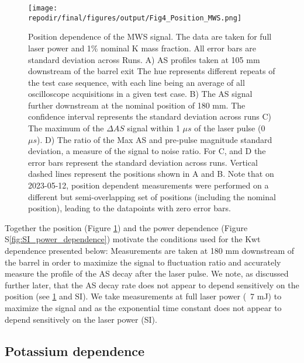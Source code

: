 \begin{figure}[h]
    \texttt{[image: \\repodir/final/figures/output/Fig4\_Position\_MWS.png]} 
    \centering
    \caption{Position dependence of the MWS signal. The data are taken for full laser power and 1\% nominal K mass fraction. All error bars are standard deviation across Runs.  A) AS profiles taken at 105 mm downstream of the barrel exit The hue represents different repeats of the test case sequence, with each line being an average of all oscilloscope acquisitions in a given test case.  B) The AS signal further downstream at the nominal position of 180 mm. The confidence interval represents the standard deviation across runs C)  The maximum of the $\Delta AS$ signal within 1 $\mu s$ of the laser pulse (0 $\mu s$).  D) The ratio of the Max AS and pre-pulse magnitude standard deviation, a measure of the signal to noise ratio. For C, and D the error bars represent the standard deviation across runs. Vertical dashed lines represent the positions shown in A and B. Note that on 2023-05-12, position dependent measurements were performed on a different but semi-overlapping set of positions (including the nominal position), leading to the datapoints with zero error bars. } 
    \label{fig:pos_dependence_mws}
\end{figure}


Together the position (Figure \ref{fig:pos_dependence_mws}) and the power dependence (Figure S\ref*{fig:SI_power_dependence}) motivate the conditions used for the Kwt dependence presented below: Measurements are taken at 180 mm downstream of the barrel in order to maximize the signal to fluctuation ratio and accurately measure the profile of the AS decay after the laser pulse. We note, as discussed further later, that the AS decay rate does not appear to depend sensitively on the position (see \ref{fig:pos_dependence_mws} and SI). We take measurements at full laser power (~7 mJ) to maximize the signal and as the exponential time constant does not appear to depend sensitively on the laser power (SI).

\clearpage

\subsection{Potassium dependence}

